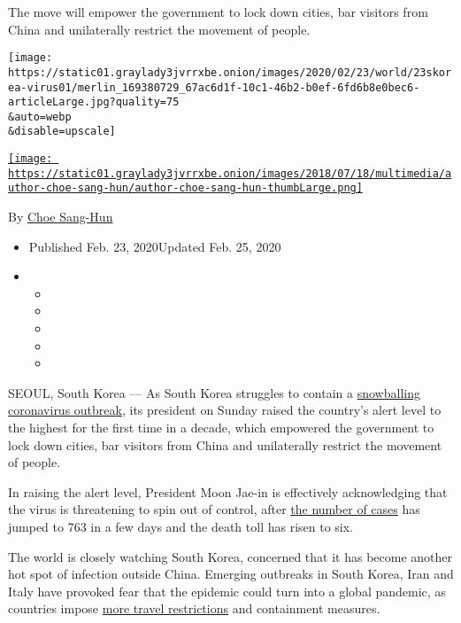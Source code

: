 The move will empower the government to lock down cities, bar visitors
from China and unilaterally restrict the movement of people.

\texttt{[image: https://static01.graylady3jvrrxbe.onion/images/2020/02/23/world/23skorea-virus01/merlin\_169380729\_67ac6d1f-10c1-46b2-b0ef-6fd6b8e0bec6-articleLarge.jpg?quality=75\\\&auto=webp\\\&disable=upscale]}

\href{https://www.nytimes3xbfgragh.onion/by/choe-sang-hun}{\texttt{[image: https://static01.graylady3jvrrxbe.onion/images/2018/07/18/multimedia/author-choe-sang-hun/author-choe-sang-hun-thumbLarge.png]}}

By \href{https://www.nytimes3xbfgragh.onion/by/choe-sang-hun}{Choe
Sang-Hun}

\begin{itemize}
\item
  Published Feb. 23, 2020Updated Feb. 25, 2020
\item
  \begin{itemize}
  \item
  \item
  \item
  \item
  \item
  \end{itemize}
\end{itemize}

SEOUL, South Korea --- As South Korea struggles to contain a
\href{http://www.nytimes3xbfgragh.onion/2020/02/25/world/asia/daegu-south-korea-coronavirus.html}{snowballing
coronavirus outbreak}, its president on Sunday raised the country's
alert level to the highest for the first time in a decade, which
empowered the government to lock down cities, bar visitors from China
and unilaterally restrict the movement of people.

In raising the alert level, President Moon Jae-in is effectively
acknowledging that the virus is threatening to spin out of control,
after
\href{https://www.nytimes3xbfgragh.onion/interactive/2020/world/asia/china-wuhan-coronavirus-maps.html}{the
number of cases} has jumped to 763 in a few days and the death toll has
risen to six.

The world is closely watching South Korea, concerned that it has become
another hot spot of infection outside China. Emerging outbreaks in South
Korea, Iran and Italy have provoked fear that the epidemic could turn
into a global pandemic, as countries impose
\href{https://www.nytimes3xbfgragh.onion/interactive/2020/02/21/business/coronavirus-airline-travel.html}{more
travel restrictions} and containment measures.

